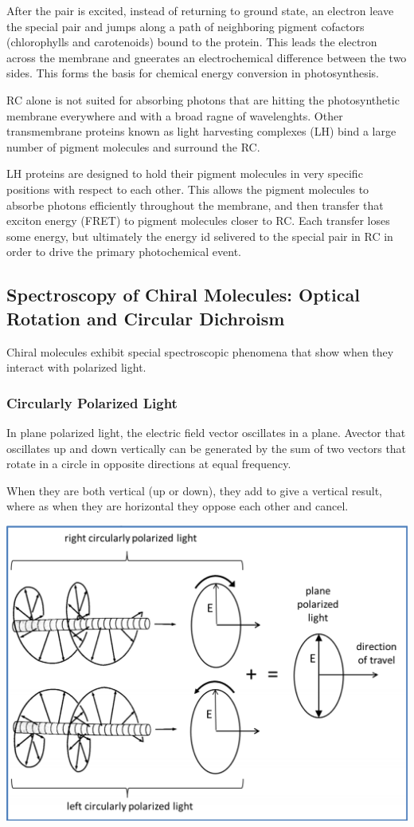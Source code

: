 \documentclass[12pt, letterpaper]{article}
\begin{document}
After the pair is excited, instead of returning to ground state, an electron leave the special pair and jumps along a path of neighboring pigment cofactors (chlorophylls and carotenoids) bound to the protein. 
This leads the electron across the membrane and gneerates an electrochemical difference between the two sides. This forms the basis for chemical energy conversion in photosynthesis. 

RC alone is not suited for absorbing photons that are hitting the photosynthetic membrane everywhere and with a broad ragne of wavelenghts. Other transmembrane proteins known as light harvesting complexes (LH)
bind a large number of pigment molecules and surround the RC. 

LH proteins are designed to hold their pigment molecules in very specific positions with respect to each other. This allows the pigment molecules to absorbe photons efficiently throughout the membrane,
and then transfer that exciton energy (FRET) to pigment molecules closer to RC. Each transfer loses some energy, but ultimately the energy id selivered to the special pair in RC in order to drive the primary photochemical event. 

\subsection*{Spectroscopy of Chiral Molecules: Optical Rotation and Circular Dichroism}
Chiral molecules exhibit special spectroscopic phenomena that show when they interact with polarized light. 

\subsubsection*{Circularly Polarized Light}
In plane polarized light, the electric field vector oscillates in a plane. Avector that oscillates up and down vertically can be generated by the sum of two vectors that rotate
in a circle in opposite directions at equal frequency. 

When they are both vertical (up or down), they add to give a vertical result, where as when they are horizontal they oppose each other and cancel. 
\begin{center}
    \includegraphics[scale=0.5]{circular polarization.png}
\end{center}
\end{document}
